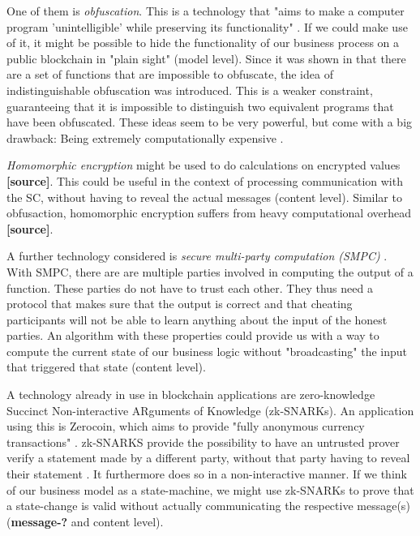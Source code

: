 \documentclass[runningheads]{llncs}
\newcommand{\comment}[1]{}
\begin{document}
One of them is \textit{obfuscation}. This is a technology that "aims to make a computer program 'unintelligible' while preserving its functionality" \cite{garg2016candidate}. If we could make use of it, it might be possible to hide the functionality of our business process on a public blockchain in "plain sight" (model level). Since it was shown in \cite{barak2001possibility,barak2012possibility} that there are a set of functions that are impossible to obfuscate, the idea of indistinguishable obfuscation was introduced. This is a weaker constraint, guaranteeing that it is impossible to distinguish two equivalent programs that have been obfuscated. These ideas seem to be very powerful, but come with a big drawback: Being extremely computationally expensive \cite{banescu2015idea}.
\comment{
According to \cite{banescu2015idea}, to even generate an obfuscation of a 2-bit multiplication circuit would take about $10^{27}$ years on a 2,6 GHz CPU.} 


\textit{Homomorphic encryption} might be used to do calculations on encrypted values \textbf{[source]}. This could be useful in the context of processing communication with the SC, without having to reveal the actual messages (content level). Similar to obfusaction, homomorphic encryption suffers from heavy computational overhead \textbf{[source]}.


A further technology considered is \textit{secure multi-party computation (SMPC)} \cite{orlandi2011multiparty}. With SMPC, there are are multiple parties involved in computing the output of a function. These parties do not have to trust each other. They thus need a protocol that makes sure that the output is correct and that cheating participants will not be able to learn anything about the input of the honest parties. An algorithm with these properties could provide us with a way to compute the current state of our business logic without "broadcasting" the input that triggered that state (content level). 

\comment{
\textbf{Inefficient \textbf{SOURCE?}. Why did we not use this? -> model level}
}

A technology already in use in blockchain applications are zero-knowledge Succinct Non-interactive ARguments of Knowledge (zk-SNARKs). An application using this is Zerocoin, which aims to provide "fully anonymous currency transactions" \cite{miers2013zerocoin}. zk-SNARKS provide the possibility to have an untrusted prover verify a statement made by a different party, without that party having to reveal their statement \cite{ben2013snarks}. It furthermore does so in a non-interactive manner. If we think of our business model as a state-machine, we might use zk-SNARKs to prove that a state-change is valid without actually communicating the respective message(s) (\textbf{message-?} and content level).
\end{document}
